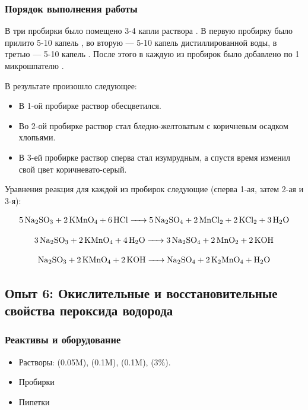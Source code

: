 \documentclass[a4paper, 12pt]{article}
\begin{document}
\subsubsection{Порядок выполнения работы}

В три пробирки было помещено 3-4 капли раствора . В первую пробирку было прилито 5-10 капель , во вторую --- 5-10 капель дистиллированной воды, в третью --- 5-10 капель . После этого в каждую из пробирок было добавлено по 1 микрошпателю .

В результате произошло следующее:

\begin{itemize}
	\item В 1-ой пробирке раствор обесцветился.
	
	\item Во 2-ой пробирке раствор стал бледно-желтоватым с коричневым осадком хлопьями.
	
	\item В 3-ей пробирке раствор сперва стал изумрудным, а спустя время изменил свой цвет коричневато-серый.
\end{itemize}

Уравнения реакция для каждой из пробирок следующие (сперва 1-ая, затем 2-ая и 3-я):

\begin{equation}
	\ce{5Na2SO3 + 2KMnO4 + 6HCl -> 5Na2SO4 + 2MnCl2 + 2KCl2 + 3H2O}
\end{equation}

\begin{equation}
	\ce{3Na2SO3 + 2KMnO4 + 4H2O -> 3Na2SO4 + 2MnO2 + 2KOH}
\end{equation}

\begin{equation}
	\ce{Na2SO3 + 2KMnO4 + 2KOH -> Na2SO4 + 2K2MnO4 + H2O}
\end{equation}

\subsection{Опыт 6: Окислительные и восстановительные свойства пероксида водорода}

\subsubsection{Реактивы и оборудование}

\begin{itemize}
	\item Растворы:  (0.05M),  (0.1M),  (0.1M),  (3\%).
	
	\item Пробирки
	
	\item Пипетки
\end{itemize}
\end{document}

